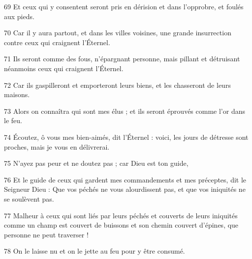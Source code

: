 \par 69 Et ceux qui y consentent seront pris en dérision et dans l'opprobre, et foulés aux pieds.
\par 70 Car il y aura partout, et dans les villes voisines, une grande insurrection contre ceux qui craignent l'Éternel.
\par 71 Ils seront comme des fous, n'épargnant personne, mais pillant et détruisant néanmoins ceux qui craignent l'Éternel.
\par 72 Car ils gaspilleront et emporteront leurs biens, et les chasseront de leurs maisons.
\par 73 Alors on connaîtra qui sont mes élus ; et ils seront éprouvés comme l'or dans le feu.
\par 74 Écoutez, ô vous mes bien-aimés, dit l'Éternel : voici, les jours de détresse sont proches, mais je vous en délivrerai.
\par 75 N'ayez pas peur et ne doutez pas ; car Dieu est ton guide,
\par 76 Et le guide de ceux qui gardent mes commandements et mes préceptes, dit le Seigneur Dieu : Que vos péchés ne vous alourdissent pas, et que vos iniquités ne se soulèvent pas.
\par 77 Malheur à ceux qui sont liés par leurs péchés et couverts de leurs iniquités comme un champ est couvert de buissons et son chemin couvert d'épines, que personne ne peut traverser !
\par 78 On le laisse nu et on le jette au feu pour y être consumé.

